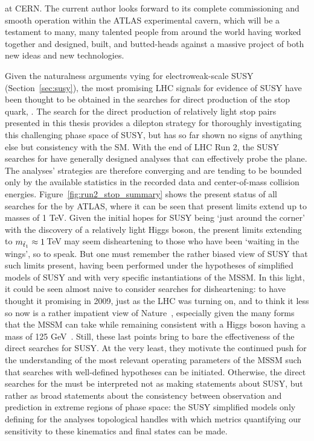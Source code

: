 at CERN.
The current author looks forward to its complete commissioning and smooth operation within the ATLAS experimental cavern,
which will be a testament to many, many talented people from around the world having worked together
and designed, built, and butted-heads against a massive project of both new ideas and new technologies.


Given the naturalness arguments vying for electroweak-scale SUSY (Section~\ref{sec:susy}),
the most promising LHC signals for evidence of SUSY have been thought to be obtained in the searches for direct production
of the stop quark, \stopone.
The search for the direct production of relatively light stop pairs presented in this thesis provides a dilepton
strategy for thoroughly investigating this challenging phase space of SUSY, but has so far shown no signs of anything else
but consistency with the SM.
With the end of LHC Run 2, the SUSY searches for \stopone have generally designed analyses that can effectively
probe the \msn plane.
The analyses' strategies are therefore converging and are tending to be bounded only by the available statistics
in the recorded data and center-of-mass collision energies.
Figure~\ref{fig:run2_stop_summary} shows the present status of all searches for the \stopone by ATLAS,
where it can be seen that present limits extend up to \stopone masses of 1 TeV.
Given the initial hopes for SUSY being `just around the corner' with the discovery of a relatively light Higgs boson,
the present limits extending to $m_{\tilde{t}_1} \approx 1$\,TeV may seem disheartening to those who
have been `waiting in the wings', so to speak.
But one must remember the rather biased view of SUSY that such limits present, having been performed
under the hypotheses of simplified models of SUSY and with very specific instantiations of the MSSM.
In this light, it could be seen almost naive to consider searches for \stopone disheartening:
to have thought it promising in 2009, just as the LHC was turning on, and to think it less so now
is a rather impatient view of Nature~\cite{FengNaturalness}, especially given the many forms that the MSSM
can take while remaining consistent with a Higgs boson having a mass of 125 GeV~\cite{SUSYPrimer}.
Still, these last points bring to bare the effectiveness of the direct searches for SUSY.
At the very least, they motivate the continued push for the understanding of the most relevant
operating parameters of the MSSM such that searches with well-defined hypotheses can
be initiated.
Otherwise, the direct searches for the \stopone must be interpreted not as making statements
about SUSY, but rather as broad statements about the consistency between observation and prediction in extreme regions of phase space:
the SUSY simplified models only defining for the analyses topological handles with which metrics
quantifying our sensitivity to these kinematics and final states can be made.

